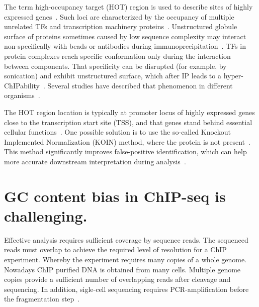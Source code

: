 The term high-occupancy target (HOT) region is used to describe sites of highly expressed genes~\cite{teytelman2013highly}.  
Such loci are characterized by the occupancy of multiple unrelated TFs and transcription machinery proteins~\cite{boyle2014comparative}. 
Unstructured globule surface of proteins sometimes caused by low sequence complexity may interact non-specifically with beads or antibodies during immunoprecipitation~\cite{teytelman2013highly}.
TFs in protein complexes reach specific conformation only during the interaction between components. 
That specificity can be disrupted (for example, by sonication) and exhibit unstructured surface, which after IP leads to a hyper-ChIPability~\cite{jain2015active}.
Several studies have described that phenomenon in different organisms~\cite{boyle2014comparative, fan2009does, krebs2014optimization, teytelman2013highly,   waldminghaus2010chip, xie2013dynamic}.

The HOT region location is typically at promoter locus of highly expressed genes close to the transcription start site (TSS), and that genes stand behind essential cellular functions~\cite{wreczycka2019hot}. 
One possible solution is to use the so-called Knockout Implemented Normalization (KOIN) method, where the protein is not present~\cite{krebs2014optimization}. 
This method significantly improves false-positive identification, which can help more accurate downstream interpretation during analysis~\cite{wreczycka2019hot}.

\section{GC content bias in ChIP-seq is challenging.}

Effective analysis requires sufficient coverage by sequence reads. 
The sequenced reads must overlap to achieve the required level of resolution for a ChIP experiment.
Whereby the experiment requires many copies of a whole genome.
Nowadays ChIP purified DNA is obtained from many cells.
Multiple genome copies provide a sufficient number of overlapping reads after cleavage and sequencing.
In addition, sigle-cell sequencing requires PCR-amplification before the fragmentation step~\cite{clark2016single}.


